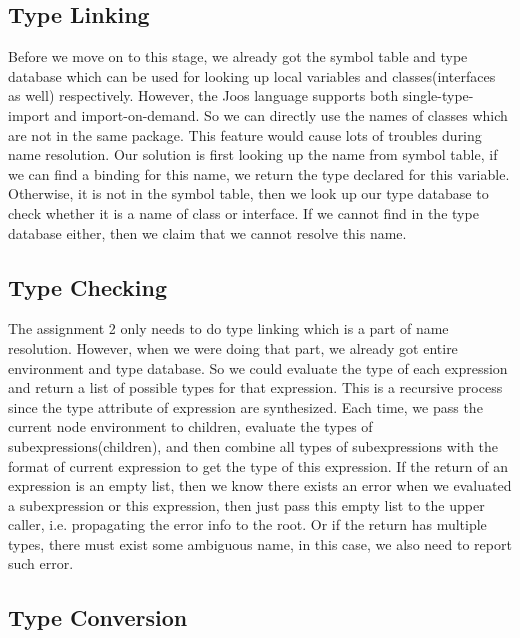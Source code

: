 \documentclass[12pt,letterpaper]{article}
\begin{document}
\subsection{Type Linking}

Before we move on to this stage, we already got the symbol table and type database which can be used for looking up local variables and classes(interfaces as well) respectively.
However, the Joos language supports both single-type-import and import-on-demand.
So we can directly use the names of classes which are not in the same package.
This feature would cause lots of troubles during name resolution.
Our solution is first looking up the name from symbol table, if we can find a binding for this name, we return the type declared for this variable.
Otherwise, it is not in the symbol table, then we look up our type database to check whether it is a name of class or interface.
If we cannot find in the type database either, then we claim that we cannot resolve this name.



\subsection{Type Checking}

The assignment 2 only needs to do type linking which is a part of name resolution. However, when we were doing that part, we already got entire environment and type database.
So we could evaluate the type of each expression and return a list of possible types for that expression.
This is a recursive process since the type attribute of expression are synthesized.
Each time, we pass the current node environment to children, evaluate the types of subexpressions(children), and then combine all types of subexpressions with the format of current expression to get the type of this expression. 
If the return of an expression is an empty list, then we know there exists an error when we evaluated a subexpression or this expression, then just pass this empty list to the upper caller, i.e. propagating the error info to the root.
Or if the return has multiple types, there must exist some ambiguous name, in this case, we also need to report such error.

\subsection{Type Conversion}
\end{document}
